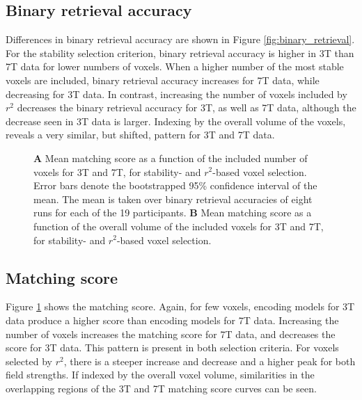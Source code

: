 \subsection*{Binary retrieval accuracy}

Differences in binary retrieval accuracy are shown in Figure
\ref{fig:binary_retrieval}. For the stability selection criterion, binary retrieval
accuracy is higher in 3T than 7T data for lower numbers of voxels.
When a higher number of the most stable voxels are included, binary retrieval
accuracy increases for 7T data, while decreasing for 3T data. In
contrast, increasing the number of voxels included by $r^2$ decreases the
binary retrieval accuracy for 3T, as well as 7T data, although the
decrease seen in 3T data is larger. Indexing by the overall volume of the voxels, reveals a very similar,
but shifted, pattern for 3T and 7T data.

\begin{figure}
  \centering
  \def\svgwidth{\linewidth}
  
	
  \caption{\textbf{A} Mean matching score as a function of the included number
  of voxels for 3T and 7T, for stability- and $r^2$-based voxel selection.
  Error bars denote the bootstrapped 95\% confidence interval of the mean. The
  mean is taken over binary retrieval accuracies of eight runs for each of the
  19 participants. \textbf{B} Mean matching score as a function of the overall
volume of the included voxels for 3T and 7T, for stability- and
$r^2$-based voxel selection.}

 \label{fig:matching_score}
\end{figure}

\subsection*{Matching score}

Figure \ref{fig:matching_score} shows the matching score. Again, for few
voxels, encoding models for 3T data produce a higher score than encoding
models for 7T data. Increasing the number of voxels increases the matching
score for 7T data, and decreases the score for 3T data. This pattern
is present in both selection criteria. For voxels selected by $r^2$, there is a
steeper increase and decrease and a higher peak for both field strengths.  If
indexed by the overall voxel volume, similarities in the overlapping regions of
the 3T and 7T matching score curves can be seen.


